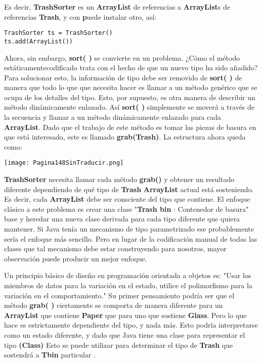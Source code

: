 Es decir, \textbf{TrashSorter} es un \textbf{ArrayList} de referencias a \textbf{ArrayList}s de referencias \textbf{Trash}, y con \textbf puede instalar otro, así:  \newline

\begin{lstlisting} 
TrashSorter ts = TrashSorter() 
ts.add(ArrayList()) 
\end{lstlisting}

Ahora, sin embargo, \textbf{ sort( )} se convierte en un problema. ¿Cómo el método estáticamente\-codificado trata con el hecho de que un nuevo tipo ha sido añadido? Para solucionar esto, la información de tipo debe ser removido de \textbf{sort( )} de manera que todo lo que que necesita hacer es llamar a un método genérico que se ocupa de los detalles del tipo. Esto, por supuesto, es otra manera de describir un método dinámicamente enlazado. Así \textbf{sort( )} simplemente se moverá a través de la secuencia y llamar a un método dinámicamente enlazado para cada \textbf{ArrayList}. Dado que el trabajo de este método es tomar las piezas de basura en que está interesado, este es llamado \textbf{grab(Trash)}. La estructura ahora queda como:       \newline

\texttt{[image: Pagina148SinTraducir.png]}

\textbf{TrashSorter} necesita llamar cada método \textbf{grab()} y obtener un resultado diferente dependiendo de qué tipo de \textbf{Trash} \textbf{ArrayList} actual está sosteniendo. Es decir, cada \textbf{ArrayList} debe ser consciente del tipo que contiene. El enfoque clásico a este problema es crear una clase "\textbf{Trash bin} : Contenedor de basura" base y heredar una nueva clase derivada para cada tipo diferente que quiera mantener. Si Java tenía un mecanismo de tipo parametrizado ese probablemente sería el enfoque más sencillo. Pero en lugar de la codificación manual de todas las clases que tal mecanismo debe estar construyendo para nosotros, mayor observación puede producir un mejor enfoque.   \newline

Un principio básico de diseño en programación orientada a objetos es: "Usar los miembros de datos para la variación en el estado, utilice el polimorfismo para la variación en el comportamiento." Su primer pensamiento podría ser que el método \textbf{grab( )} ciertamente se comporta de manera diferente para un \textbf{ArrayList} que contiene \textbf{Paper} que para uno que sostiene \textbf{Glass}. Pero lo que hace es estrictamente dependiente del tipo, y nada más. Esto podría interpretarse como un estado diferente, y dado que Java tiene una clase para representar el tipo \textbf{(Class)} Esto se puede utilizar para determinar el tipo de \textbf{Trash} que sostendrá a \textbf{Tbin} particular .       \newline

